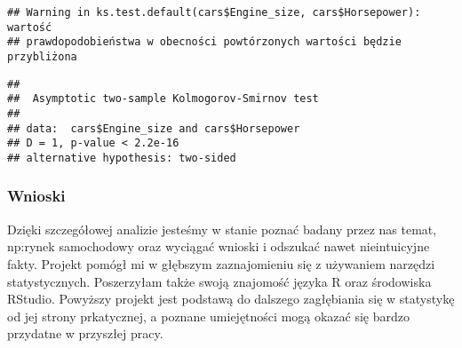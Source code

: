 \documentclass[
]{article}
\begin{document}
\begin{verbatim}
## Warning in ks.test.default(cars$Engine_size, cars$Horsepower): wartość
## prawdopodobieństwa w obecności powtórzonych wartości będzie przybliżona
\end{verbatim}

\begin{verbatim}
## 
##  Asymptotic two-sample Kolmogorov-Smirnov test
## 
## data:  cars$Engine_size and cars$Horsepower
## D = 1, p-value < 2.2e-16
## alternative hypothesis: two-sided
\end{verbatim}

\hypertarget{section}{%
\subsubsection{}\label{section}}

\hypertarget{wnioski}{%
\subsubsection{Wnioski}\label{wnioski}}

Dzięki szczegółowej analizie jesteśmy w stanie poznać badany przez nas
temat, np:rynek samochodowy oraz wyciągać wnioski i odszukać nawet
nieintuicyjne fakty. Projekt pomógł mi w głębszym zaznajomieniu się z
używaniem narzędzi statystycznych. Poszerzyłam także swoją znajomość
języka R oraz środowiska RStudio. Powyższy projekt jest podstawą do
dalszego zagłębiania się w statystykę od jej strony prkatycznej, a
poznane umiejętności mogą okazać się bardzo przydatne w przyszłej pracy.
\end{document}
